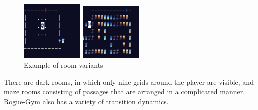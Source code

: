 \documentclass[conference]{IEEEtran}
\begin{document}
\begin{figure}[t]
  \begin{minipage}[cbt]{4cm}
   \centering
   \includegraphics[width=3.0cm]{pictures/darkroom.png}
  \end{minipage}
  \begin{minipage}[cbt]{4cm}
   \centering
   \includegraphics[width=3.0cm]{pictures/maze.png}
  \end{minipage}
 \caption{Example of room variants} \label{room}
\end{figure}
There are dark rooms, in which only nine grids around the player are visible,
and maze rooms consisting of passages that are arranged in a complicated manner.
Rogue-Gym also has a variety of transition dynamics.
\end{document}
